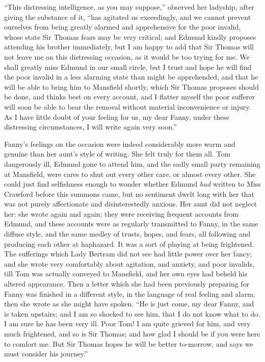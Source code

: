 \documentclass{article}
\begin{document}
``This distressing intelligence, as you may suppose,''
observed her ladyship, after giving the substance of it,
``has agitated us exceedingly, and we cannot prevent
ourselves from being greatly alarmed and apprehensive
for the poor invalid, whose state Sir Thomas fears may
be very critical; and Edmund kindly proposes attending
his brother immediately, but I am happy to add that Sir
Thomas will not leave me on this distressing occasion,
as it would be too trying for me.  We shall greatly miss
Edmund in our small circle, but I trust and hope he
will find the poor invalid in a less alarming state than
might be apprehended, and that he will be able to bring
him to Mansfield shortly, which Sir Thomas proposes
should be done, and thinks best on every account, and I
flatter myself the poor sufferer will soon be able to bear
the removal without material inconvenience or injury.
As I have little doubt of your feeling for us, my dear Fanny,
under these distressing circumstances, I will write again
very soon.''

Fanny's feelings on the occasion were indeed considerably
more warm and genuine than her aunt's style of writing.
She felt truly for them all.  Tom dangerously ill,
Edmund gone to attend him, and the sadly small party
remaining at Mansfield, were cares to shut out every
other care, or almost every other.  She could just find
selfishness enough to wonder whether Edmund \emph{had} written
to Miss Crawford before this summons came, but no sentiment
dwelt long with her that was not purely affectionate and
disinterestedly anxious.  Her aunt did not neglect her:
she wrote again and again; they were receiving frequent
accounts from Edmund, and these accounts were as regularly
transmitted to Fanny, in the same diffuse style,
and the same medley of trusts, hopes, and fears,
all following and producing each other at haphazard.
It was a sort of playing at being frightened.
The sufferings which Lady Bertram did not see had little
power over her fancy; and she wrote very comfortably
about agitation, and anxiety, and poor invalids, till Tom
was actually conveyed to Mansfield, and her own eyes had
beheld his altered appearance.  Then a letter which she
had been previously preparing for Fanny was finished
in a different style, in the language of real feeling
and alarm; then she wrote as she might have spoken.
``He is just come, my dear Fanny, and is taken upstairs;
and I am so shocked to see him, that I do not know
what to do.  I am sure he has been very ill.  Poor Tom!
I am quite grieved for him, and very much frightened,
and so is Sir Thomas; and how glad I should be if you
were here to comfort me.  But Sir Thomas hopes he
will be better to-morrow, and says we must consider
his journey.''
\end{document}
